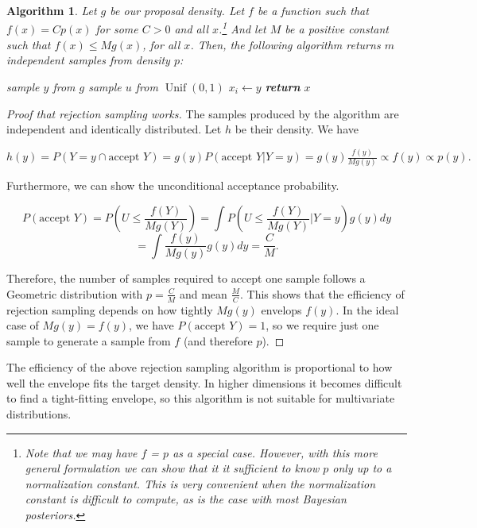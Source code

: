 \documentclass{book}
\theoremstyle{plain}%
\newtheorem{algo}{Algorithm}[section]
\theoremstyle{definition}
\DeclareMathOperator{\Unif}{Unif}
\begin{document}
\begin{algo}
Let $g$ be our proposal density. Let $f$ be a function such that $f(x) = Cp(x)$ for some $C > 0$ and all $x$.\footnote{Note that we may have $f$ = $p$ as a special case. However, with this more general formulation we can show that it it sufficient to know $p$ only up to a normalization constant. This is very convenient when the normalization constant is difficult to compute, as is the case with most Bayesian posteriors.} And let $M$ be a positive constant such that $f(x) \leq Mg(x)$, for all $x$. Then, the following algorithm returns $m$ independent samples from density $p$:

\begin{algorithmic}[1]
     
    \Repeat {}
                \State sample $y$ from $g$
                \State sample $u$ from $\Unif(0,1)$
                \State $x_i \gets y$
              \EndFor
              \State \textbf{return} $x$
        \EndProcedure
    \end{algorithmic}
\end{algo}

\begin{proof}[Proof that rejection sampling works] The samples produced by the algorithm are independent and identically distributed. Let $h$ be their density. We have  

$h(y) = P(Y = y \cap \text{accept } Y)= g(y)P(\text{accept } Y|Y = y) = g(y)\frac{f(y)}{Mg(y)} \propto f(y) \propto p(y).$

Furthermore, we can show the unconditional acceptance probability.

$$P(\text{accept } Y) = P\left(U \leq \frac{f(Y)}{Mg(Y)}\right) = \int P\left(U \leq \frac{f(Y)}{Mg(Y)}  \lvert Y = y\right)g(y)dy$$
$$ = \int \frac{f(y)}{Mg(y)} g(y)dy = \frac{C}{M}.$$

Therefore, the number of samples required to accept one sample follows a Geometric distribution with $p = \frac{C}{M}$ and mean $\frac{M}{C}$. This shows that the efficiency of rejection sampling depends on how tightly $Mg(y)$ envelops $f(y)$. In the ideal case of $Mg(y) = f(y)$, we have $P(\text{accept } Y) = 1$, so we require just one sample to generate a sample from $f$ (and therefore $p$).
\end{proof}

The efficiency of the above rejection sampling algorithm is proportional to how well the envelope fits the target density. In higher dimensions it becomes difficult to find a tight-fitting envelope, so this algorithm is not suitable for multivariate distributions.
\end{document}
